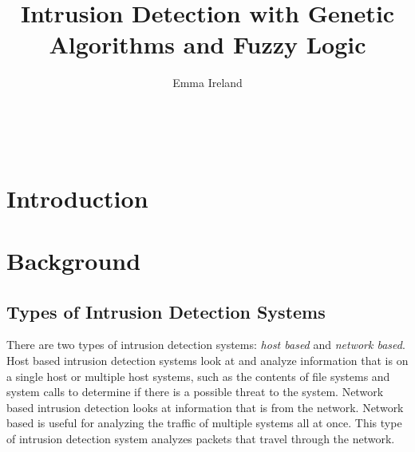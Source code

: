 \documentclass{sig-alternate}
\begin{document}

\title{Intrusion Detection with Genetic Algorithms and Fuzzy Logic}


\author{
\alignauthor
Emma Ireland\\
	\\
	\\
	\\
}

\maketitle
\begin{abstract}

\end{abstract}


\terms{}


\section{Introduction}





\section{Background}

\subsection{Types of Intrusion Detection Systems}
There are two types of intrusion detection systems: \emph{host based} and \emph{network based}. Host based intrusion detection systems look at and analyze information that is on a single host or multiple host systems, such as the contents of file systems and system calls to determine if there is a possible threat to the system. Network based intrusion detection looks at information that is from the network. Network based is useful for analyzing the traffic of multiple systems all at once. This type of intrusion detection system analyzes packets that travel through the network.~\cite{DBLP:journals/corr/abs-1204-1336}
\end{document}
